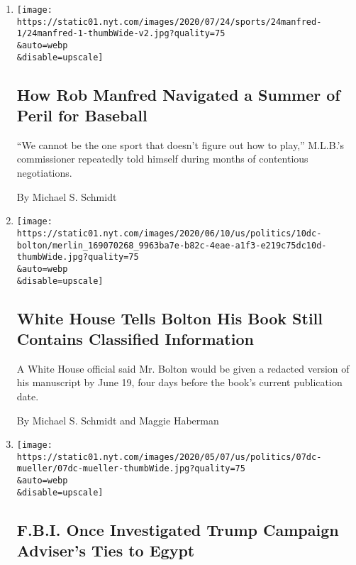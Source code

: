\begin{enumerate}
\def\labelenumi{\arabic{enumi}.}
\item
  \href{/2020/07/25/sports/rob-manfred-mlb-season.html}{}

  \texttt{[image: https://static01.nyt.com/images/2020/07/24/sports/24manfred-1/24manfred-1-thumbWide-v2.jpg?quality=75\\\&auto=webp\\\&disable=upscale]}

  \hypertarget{how-rob-manfred-navigated-a-summer-of-peril-for-baseball}{%
  \subsection{How Rob Manfred Navigated a Summer of Peril for
  Baseball}\label{how-rob-manfred-navigated-a-summer-of-peril-for-baseball}}

  ``We cannot be the one sport that doesn't figure out how to play,''
  M.L.B.'s commissioner repeatedly told himself during months of
  contentious negotiations.

  By Michael S. Schmidt
\item
  \href{/2020/06/10/us/politics/trump-john-bolton-book.html}{}

  \texttt{[image: https://static01.nyt.com/images/2020/06/10/us/politics/10dc-bolton/merlin\_169070268\_9963ba7e-b82c-4eae-a1f3-e219c75dc10d-thumbWide.jpg?quality=75\\\&auto=webp\\\&disable=upscale]}

  \hypertarget{white-house-tells-bolton-his-book-still-contains-classified-information}{%
  \subsection{White House Tells Bolton His Book Still Contains
  Classified
  Information}\label{white-house-tells-bolton-his-book-still-contains-classified-information}}

  A White House official said Mr. Bolton would be given a redacted
  version of his manuscript by June 19, four days before the book's
  current publication date.

  By Michael S. Schmidt and Maggie Haberman
\item
  \href{/2020/05/28/us/politics/mueller-walid-phares.html}{}

  \texttt{[image: https://static01.nyt.com/images/2020/05/07/us/politics/07dc-mueller/07dc-mueller-thumbWide.jpg?quality=75\\\&auto=webp\\\&disable=upscale]}

  \hypertarget{fbi-once-investigated-trump-campaign-advisers-ties-to-egypt}{%
  \subsection{F.B.I. Once Investigated Trump Campaign Adviser's Ties to
  Egypt}\label{fbi-once-investigated-trump-campaign-advisers-ties-to-egypt}}


\end{enumerate}
